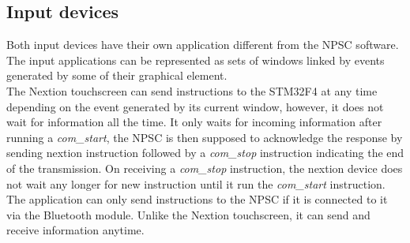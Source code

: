 \subsection{Input devices}
Both input devices have their own application different from the NPSC software. The input applications can be represented as sets of windows linked by events generated by some of their graphical element. \\
The Nextion touchscreen can send instructions to the STM32F4 at any time depending on the event generated by its current window, however, it does not wait for information all the time. It only waits for incoming information after running a \textit{com\_start}, the NPSC is then supposed to acknowledge the response by sending nextion instruction followed by a \textit{com\_stop} instruction indicating the end of the transmission. On receiving a \textit{com\_stop} instruction, the nextion device does not wait any longer for new instruction until it run the \textit{com\_start} instruction.\\ 
The application can only send instructions to the NPSC if it is connected to it via the Bluetooth module. Unlike the Nextion touchscreen, it can send and receive information anytime.

